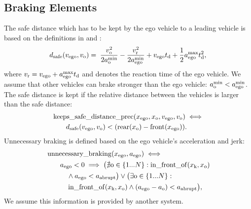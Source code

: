 \subsection{Braking Elements}
The safe distance which has to be kept by the ego vehicle to a leading vehicle is based on the definitions in \cite{Pek2017a} and \cite{Rizaldi2016}:
\begin{align*} 
d_\text{safe}(v_\text{ego}, v_\text{o}) =  \; \frac{v_\text{o}^2}{2 a_\text{o}^\text{min}} - \frac{v_\mathrm{r}^2}{2 a_\text{ego}^\text{min}} + v_\text{ego} t_\text{d} + \frac{1}{2} a_\text{ego}^\text{max} t_\text{d}^2,  
\end{align*} 
where $v_\mathrm{r} = v_\text{ego} + a_\text{ego}^\text{max} t_\text{d}$ and \timeDelay denotes the reaction time of the ego vehicle. We assume that other vehicles can brake stronger than the ego vehicle: $a_\text{o}^\text{min} < a_\text{ego}^\text{min}$.
The safe distance is kept if the relative distance between the vehicles is larger than the safe distance:
\begin{align*}
\begin{split}
&\operatorname*{keeps\_safe\_distance\_prec}(x_\text{ego}, x_\text{o}, v_\text{ego}, v_\text{o}) \iff \\ 
& \qquad d_\text{safe}(v_\text{ego}, v_\text{o}) < (\operatorname*{rear}(x_\text{o}) - \operatorname*{front}(x_\text{ego})).
\end{split}
\end{align*}
Unnecessary braking is defined based on the ego vehicle's acceleration and jerk:
\begin{align*}
\begin{split}
&\operatorname*{unnecessary\_braking}(x_\text{ego}, a_\text{ego}) \iff \\
&\qquad a_\text{ego} < 0 \implies \big(\nexists \text{o} \in \{1 ... N\} : \operatorname*{in\_front\_of}(x_\text{k}, x_\text{o})  \\
&\qquad \quad \land a_\text{ego} < a_\text{abrupt} \big) \lor \big(\exists \text{o} \in \{1 ... N\} : \\
&\qquad \quad \operatorname*{in\_front\_of}(x_\text{k}, x_\text{o})  \land (a_\text{ego} - a_\text{o}) <  a_\text{abrupt} \big),
\end{split}
\end{align*}
We assume this information is provided by another system.

